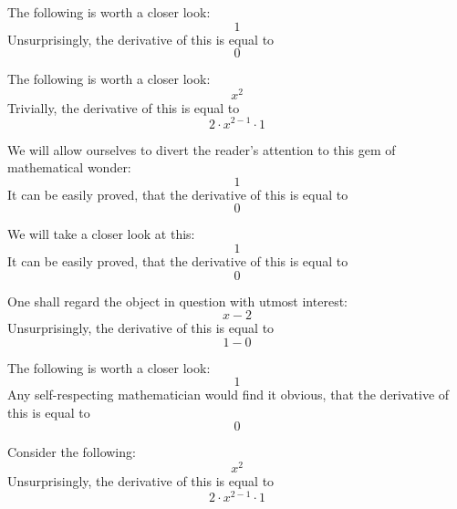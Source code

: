 \documentclass{article}
\begin{document}
The following is worth a closer look:
\begin{equation}
1 
\end{equation}
Unsurprisingly, the derivative of this is equal to
\begin{equation}
0 
\end{equation}

The following is worth a closer look:
\begin{equation}
x ^{2 } 
\end{equation}
Trivially, the derivative of this is equal to
\begin{equation}
2 \cdot x ^{2 - 1 } \cdot 1 
\end{equation}

We will allow ourselves to divert the reader's attention to this gem of mathematical wonder:
\begin{equation}
1 
\end{equation}
It can be easily proved, that the derivative of this is equal to
\begin{equation}
0 
\end{equation}

We will take a closer look at this:
\begin{equation}
1 
\end{equation}
It can be easily proved, that the derivative of this is equal to
\begin{equation}
0 
\end{equation}

One shall regard the object in question with utmost interest:
\begin{equation}
x - 2 
\end{equation}
Unsurprisingly, the derivative of this is equal to
\begin{equation}
1 - 0 
\end{equation}

The following is worth a closer look:
\begin{equation}
1 
\end{equation}
Any self-respecting mathematician would find it obvious, that the derivative of this is equal to
\begin{equation}
0 
\end{equation}

Consider the following:
\begin{equation}
x ^{2 } 
\end{equation}
Unsurprisingly, the derivative of this is equal to
\begin{equation}
2 \cdot x ^{2 - 1 } \cdot 1 
\end{equation}
\end{document}
